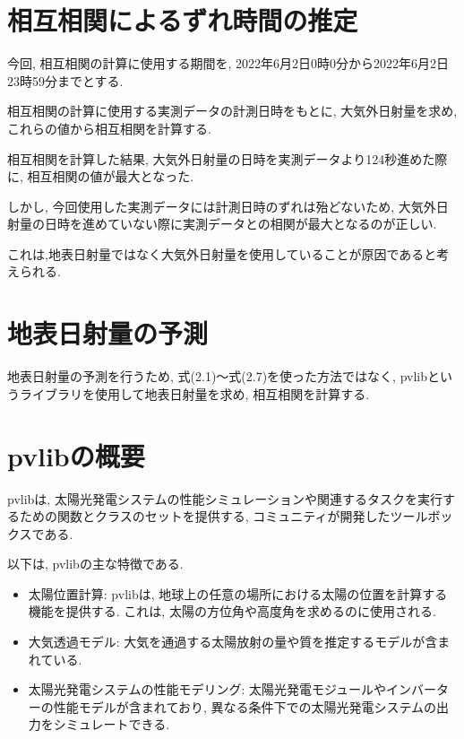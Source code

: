 
\section{相互相関によるずれ時間の推定}
今回, 相互相関の計算に使用する期間を, 2022年6月2日0時0分から2022年6月2日23時59分までとする.


相互相関の計算に使用する実測データの計測日時をもとに, 大気外日射量を求め, これらの値から相互相関を計算する.

相互相関を計算した結果, 大気外日射量の日時を実測データより124秒進めた際に, 相互相関の値が最大となった.

しかし, 今回使用した実測データには計測日時のずれは殆どないため, 大気外日射量の日時を進めていない際に実測データとの相関が最大となるのが正しい.

これは,地表日射量ではなく大気外日射量を使用していることが原因であると考えられる.

\section{地表日射量の予測}

地表日射量の予測を行うため, 式(2.1)～式(2.7)を使った方法ではなく, pvlibというライブラリを使用して地表日射量を求め, 相互相関を計算する.

\section{pvlibの概要}
pvlibは, 太陽光発電システムの性能シミュレーションや関連するタスクを実行するための関数とクラスのセットを提供する, コミュニティが開発したツールボックスである. 

以下は, pvlibの主な特徴である.

\begin{itemize}
  \item 太陽位置計算: pvlibは, 地球上の任意の場所における太陽の位置を計算する機能を提供する. これは, 太陽の方位角や高度角を求めるのに使用される.
  \item 大気透過モデル: 大気を通過する太陽放射の量や質を推定するモデルが含まれている.
  \item 太陽光発電システムの性能モデリング: 太陽光発電モジュールやインバーターの性能モデルが含まれており, 異なる条件下での太陽光発電システムの出力をシミュレートできる.
\end{itemize}

